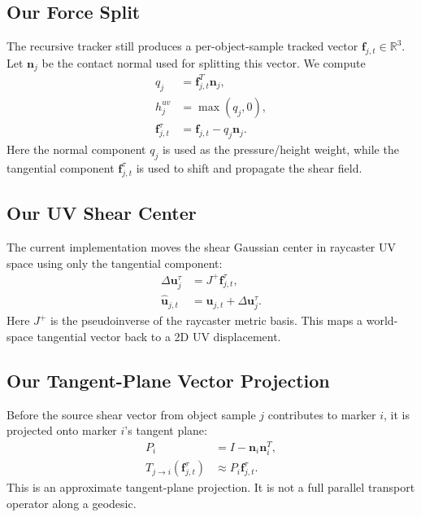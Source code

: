 \documentclass[11pt]{article}
\newcommand{\R}{\mathbb{R}}
\begin{document}
\subsection{Our Force Split}

The recursive tracker still produces a per-object-sample tracked vector
$\mathbf{f}_{j,t}\in\R^3$. Let $\mathbf{n}_j$ be the contact normal used for
splitting this vector. We compute
\begin{align}
    q_j
    &=
    \mathbf{f}_{j,t}^{T}\mathbf{n}_j, \\
    h^{uv}_j
    &=
    \max(q_j,0), \\
    \mathbf{f}^{\tau}_{j,t}
    &=
    \mathbf{f}_{j,t}
    -
    q_j\mathbf{n}_j.
    \label{eq:our-force-split}
\end{align}
Here the normal component $q_j$ is used as the pressure/height weight, while
the tangential component $\mathbf{f}^{\tau}_{j,t}$ is used to shift and
propagate the shear field.

\subsection{Our UV Shear Center}

The current implementation moves the shear Gaussian center in raycaster UV
space using only the tangential component:
\begin{align}
    \Delta\mathbf{u}^{\tau}_{j}
    &=
    J^+
    \mathbf{f}^{\tau}_{j,t}, \\
    \hat{\mathbf{u}}_{j,t}
    &=
    \mathbf{u}_{j,t}
    +
    \Delta\mathbf{u}^{\tau}_{j}.
    \label{eq:our-uv-center}
\end{align}
Here $J^+$ is the pseudoinverse of the raycaster metric basis. This maps a
world-space tangential vector back to a 2D UV displacement.

\subsection{Our Tangent-Plane Vector Projection}

Before the source shear vector from object sample $j$ contributes to marker
$i$, it is projected onto marker $i$'s tangent plane:
\begin{align}
    P_i
    &=
    I
    -
    \mathbf{n}_i\mathbf{n}_i^T, \\
    T_{j\rightarrow i}
    \left(
        \mathbf{f}^{\tau}_{j,t}
    \right)
    &\approx
    P_i\mathbf{f}^{\tau}_{j,t}.
    \label{eq:our-tangent-projection}
\end{align}
This is an approximate tangent-plane projection. It is not a full parallel
transport operator along a geodesic.
\end{document}
